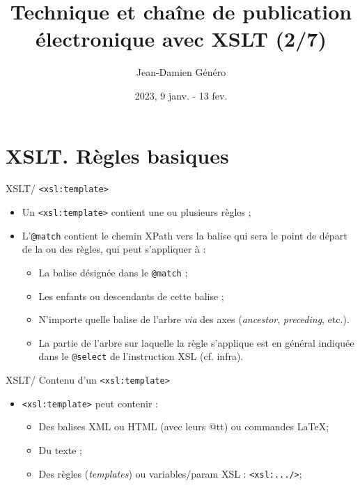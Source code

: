 \documentclass{beamer}
\title{Technique et chaîne de publication électronique avec XSLT (2/7)}
\date{2023, 9 janv. - 13 fev.}
\author{Jean-Damien Généro}
\institute{École nationale des chartes -- M2 TNAH}
\begin{document}
  \maketitle

  \section{XSLT. Règles basiques}

    \begin{frame}{XSLT/ \texttt{<xsl:template>}}
    \Large
        \begin{itemize}
            \item Un \texttt{<xsl:template>} contient une ou plusieurs règles ;
            \bigskip
            \item L'\texttt{@match} contient le chemin XPath vers la balise qui sera le point de départ de la ou des règles, qui peut s'appliquer à :
            \bigskip
            \begin{itemize}
            \large
                \item La balise désignée dans le \texttt{@match} ;
                \item Les enfants ou descendants de cette balise ;
                \item N'importe quelle balise de l'arbre \textit{via} des axes (\textit{ancestor}, \textit{preceding}, etc.).
                \bigskip
                \item La partie de l'arbre sur laquelle la règle s'applique est en général indiquée dans le \texttt{@select} de l'instruction XSL (cf. infra). %
            \end{itemize}
        \end{itemize}
    \end{frame}

     \begin{frame}{XSLT/ Contenu d'un \texttt{<xsl:template>}}
         \Large
         \begin{itemize}
             \item \texttt{<xsl:template>} peut contenir :
             \begin{itemize}
             \Large
                 \item Des balises XML ou HTML (avec leurs @tt) ou commandes \LaTeX ;
                 \item Du texte ;
                 \item Des règles (\textit{templates}) ou variables/param XSL : \texttt{<xsl:.../>};
             \end{itemize}
         \end{itemize}
     \end{frame}
\end{document}
